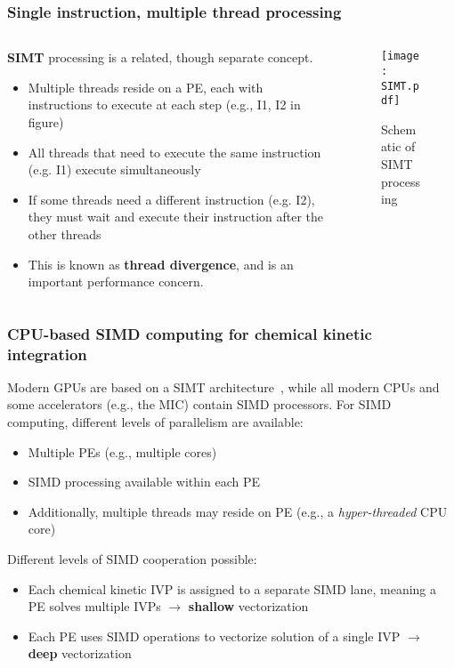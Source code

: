 \documentclass{beamer}
\begin{document}
\begin{frame}
 \frametitle{Single instruction, multiple thread processing}
 \begin{columns}
 \begin{column}{0.6\textwidth}
 \textbf{SIMT} processing is a related, though separate concept.
 \begin{itemize}
  \item Multiple threads reside on a PE, each with instructions to execute at each step (e.g., \textrm{I1}, \textrm{I2} in figure)
  \item All threads that need to execute the same instruction (e.g. \textrm{I1}) execute simultaneously
  \item If some threads need a different instruction (e.g. \textrm{I2}), they must wait and execute their instruction after the other threads
  \item This is known as \textbf{thread divergence}, and is an important performance concern.
 \end{itemize}
 \end{column}
 \begin{column}{0.4\textwidth}
  \begin{figure}[r]
    \centering
    \texttt{[image: SIMT.pdf]}
    \caption{Schematic of SIMT processing}
  \end{figure}
 \end{column}
 \end{columns}
\end{frame}

    
\begin{frame}
 \frametitle{CPU-based SIMD computing for chemical kinetic integration}
 Modern GPUs are based on a SIMT architecture~, while all modern CPUs and some accelerators (e.g., the MIC) contain SIMD processors.
 For SIMD computing, different levels of parallelism are available:
 \begin{itemize}
  \item Multiple PEs (e.g., multiple cores)
  \item SIMD processing available within each PE
  \item Additionally, multiple threads may reside on PE (e.g., a \textit{hyper-threaded} CPU core)
 \end{itemize}
 Different levels of SIMD cooperation possible:
 \begin{itemize}
  \item Each chemical kinetic IVP is assigned to a separate SIMD lane, meaning a PE solves multiple IVPs $\rightarrow$ \textbf{shallow} vectorization
  \item Each PE uses SIMD operations to vectorize solution of a single IVP $\rightarrow$ \textbf{deep} vectorization
 \end{itemize}
\end{frame}
\end{document}
